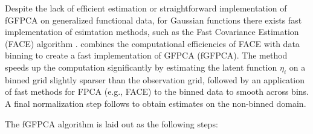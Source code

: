 \documentclass[12pt]{article}
\begin{document}
Despite the lack of efficient estimation or straightforward implementation of fGFPCA on generalized functional data, for Gaussian functions there exists fast implementation of esimtation methods, such as the Fast Covariance Estimation (FACE) algorithm \citep{face}. \citet{fGFPCA} combines the computational efficiencies of FACE with data binning to create a fast implementation of GFPCA (fGFPCA). The method speeds up the computation significantly by estimating the latent function $\eta_i$ on a binned grid slightly sparser than the observation grid, followed by an application of fast methods for FPCA (e.g., FACE) to the binned data to smooth across bins. A final normalization step follows to obtain estimates on the non-binned domain.

The fGFPCA algorithm is laid out as the following steps: 
\end{document}
